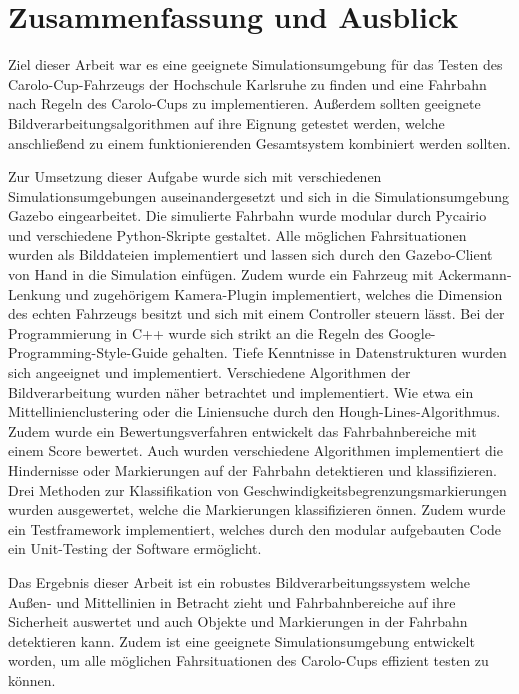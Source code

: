 %

\chapter{Zusammenfassung und Ausblick}
\label{cha:Zusammenfassung und Ausblick} 
%
%
Ziel dieser Arbeit war es eine geeignete Simulationsumgebung f\"ur das Testen des Carolo-Cup-Fahrzeugs der Hochschule Karlsruhe zu finden und eine Fahrbahn nach Regeln des Carolo-Cups zu implementieren. Au{\ss}erdem sollten geeignete Bildverarbeitungsalgorithmen auf ihre Eignung getestet werden, welche anschlie{\ss}end zu einem funktionierenden Gesamtsystem kombiniert werden sollten.

Zur Umsetzung dieser Aufgabe wurde sich mit verschiedenen Simulationsumgebungen auseinandergesetzt und sich in die Simulationsumgebung Gazebo eingearbeitet. Die simulierte Fahrbahn wurde modular durch Pycairio und verschiedene Python-Skripte gestaltet. Alle m\"oglichen Fahrsituationen wurden als Bilddateien implementiert und lassen sich durch den Gazebo-Client von Hand in die Simulation einf\"ugen. Zudem wurde ein Fahrzeug mit Ackermann-Lenkung und zugeh\"origem Kamera-Plugin implementiert, welches die Dimension des echten Fahrzeugs besitzt und sich mit einem Controller steuern l\"asst. Bei der Programmierung in C++ wurde sich strikt an die Regeln des Google-Programming-Style-Guide gehalten. Tiefe Kenntnisse in Datenstrukturen wurden sich angeeignet und implementiert.
Verschiedene Algorithmen der Bildverarbeitung wurden n\"aher betrachtet und implementiert. Wie etwa ein Mittellinienclustering oder die Liniensuche durch den Hough-Lines-Algorithmus. Zudem wurde ein Bewertungsverfahren entwickelt das Fahrbahnbereiche mit einem Score bewertet. Auch wurden verschiedene Algorithmen implementiert die Hindernisse oder Markierungen auf der Fahrbahn detektieren und klassifizieren. Drei Methoden zur Klassifikation von Geschwindigkeitsbegrenzungsmarkierungen wurden ausgewertet, welche die Markierungen klassifizieren \"onnen. Zudem wurde ein Testframework implementiert, welches durch den modular aufgebauten Code ein Unit-Testing der Software erm\"oglicht.

Das Ergebnis dieser Arbeit ist ein robustes Bildverarbeitungssystem welche Au{\ss}en- und Mittellinien in Betracht zieht und Fahrbahnbereiche auf ihre Sicherheit auswertet und auch Objekte und Markierungen in der Fahrbahn detektieren kann. Zudem ist eine geeignete Simulationsumgebung entwickelt worden, um alle m\"oglichen Fahrsituationen des Carolo-Cups effizient testen zu k\"onnen.

